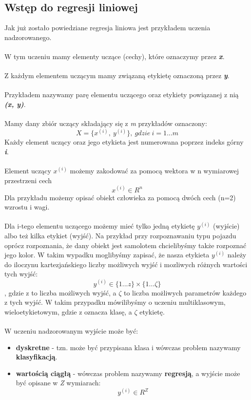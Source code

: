 \documentclass{article}
\begin{document}
\subsection{Wstęp do regresji liniowej}
Jak już zostało powiedziane regresja liniowa jest przykładem uczenia nadzorowanego.
\\
\\
W tym uczeniu mamy elementy uczące (cechy), które oznaczymy przez \textbf{\emph{x}}.
\\
\\
Z każdym elementem uczącym mamy związaną etykietę oznaczoną przez \textbf{\emph{y}}.
\\
\\
Przykładem nazywamy parę elementu uczącego oraz etykiety powiązanej z nią \textbf{\emph{(x, y)}}.
\\
\\
Mamy dany zbiór uczący składający się z \emph{m} przykładów oznaczony: \[X = \{x^{(i)},\ y^{(i)}\},\ gdzie\ i = 1...m\]
Każdy element uczący oraz jego etykieta jest numerowana poprzez indeks górny \textbf{\emph{i}}.
\\
\\
Element uczący $x^{(i)}$ możemy zakodować za pomocą wektora w n wymiarowej przestrzeni cech \[x^{(i)} \in R^n\]
Dla przykładu możemy opisać obiekt człowieka za pomocą dwóch cech (n=2) wzrostu i wagi.
\\
\\
Dla i-tego elementu uczącego możemy mieć tylko jedną etykietę $y^{(i)}$ (wyjście) albo też kilka etykiet (wyjść). Na przykład przy rozpoznawaniu typu pojazdu oprócz rozpoznania, że dany obiekt jest samolotem chcielibyśmy także rozpoznać jego kolor. W takim wypadku moglibyśmy zapisać, że nasza etykieta $y^{(i)}$ należy do iloczynu kartezjańskiego liczby możliwych wyjść i mozliwych różnych wartości tych wyjść:
\[y^{(i)} \in \{1...z\} \times \{1...\zeta\}\]
, gdzie z to liczba możliwych wyjść, a $\zeta$ to liczba możliwych parametrów każdego z tych wyjść.\newline
W takim przypadku mówilibyśmy o uczeniu multiklasowym, wieloetykietowym, gdzie z oznacza klasę, a $\zeta$ etykietę.
\\
\\
W uczeniu nadzorowanym wyjście może być:
\begin{itemize}
  \item \textbf{dyskretne} - tzn. może być przypisana klasa i wówczas problem nazywamy \textbf{klasyfikacją}.
  \item \textbf{wartością ciągłą} - wówczas problem nazywamy \textbf{regresją}, a wyjście może być opisane w \emph{Z} wymiarach:
  \[y^{(i)} \in R^Z\]
\end{itemize}
\end{document}
